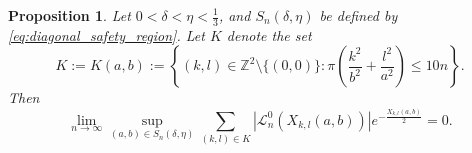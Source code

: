 \documentclass[10pt,a4paper]{amsart}
\newtheorem{proposition}{Proposition}
\newcommand{\Z}{{\mathbb Z}}
\begin{document}
\begin{proposition}\label{pro:Janssen_main}
    Let $0< \delta < \eta < \frac{1}{3}$, and $S_n(\delta,\eta)$ be defined by \eqref{eq:diagonal_safety_region}. Let $K$ denote the set
    \begin{equation}\label{eq:K_set_def}
        K := K(a,b):= \left\{(k,l)\in\Z^2\setminus\{(0,0)\}:\pi \left( \frac{k^2}{b^2}+\frac{l^2}{a^2} \right) \leq 10n\right\}.
    \end{equation}
    Then
    \begin{equation}
        \lim\limits_{n\to\infty} \sup\limits_{(a,b) \in S_n(\delta, \eta)} \sum_{(k,l)\in K} |\mathcal{L}^{0}_n(X_{k,l}(a,b))| e^{-\frac{X_{k,l}(a,b)}{2}} = 0.
    \end{equation}
\end{proposition}
\end{document}
